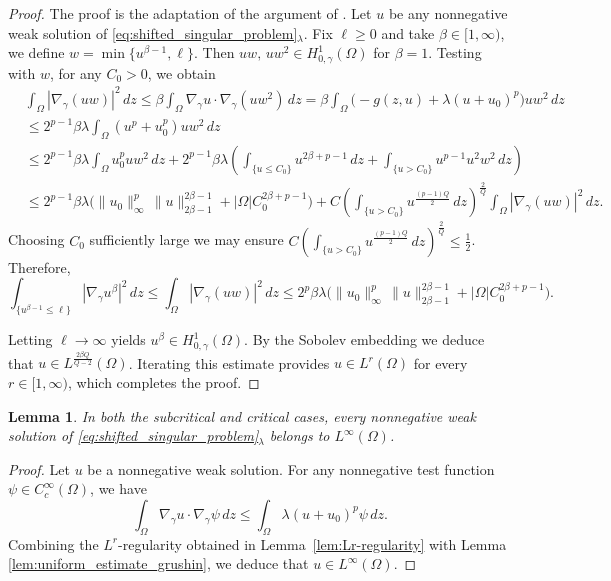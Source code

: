 \documentclass[11pt]{article}
\newtheorem{lemma}{Lemma}[section] %
\newcommand{\gradgr}{\nabla_{\gamma}}
\newcommand{\spacegr}{H^{1}_{0,\gamma}(\Omega)}
\begin{document}
\begin{proof}
The proof is the adaptation of the argument of \cite[Lemma B.3]{struwe_variational_methods}. Let $u$ be any nonnegative weak solution of \eqref{eq:shifted_singular_problem}$_\lambda$. 
Fix $\ell\ge0$ and take $\beta\in[1,\infty)$, we define $w = \min\{u^{\beta-1}, \ell\}$.
Then $uw,\,uw^2\in \spacegr$ for $\beta = 1$. Testing with $w$, for any $C_{0}>0$, we obtain
\begin{equation*}
\begin{aligned}
&\int_\Omega |\gradgr(uw)|^2\,dz
\le \beta \int_\Omega \gradgr u\cdot\gradgr(uw^2)\,dz  = \beta\int_\Omega\big(-g(z,u)+\lambda(u+u_{0})^p\big)uw^2\,dz \\
& \leq 2^{p-1}\beta\lambda\int_\Omega (u^p+u_{0}^p)uw^2\,dz \\
&\le 2^{p-1}\beta\lambda\int_\Omega u_{0}^p uw^2\,dz
+2^{p-1}\beta\lambda\left(
\int_{\{u\le C_{0}\}} u^{2\beta+p-1}\,dz
+\int_{\{ u>C_{0} \}} u^{p-1}u^2w^2\,dz
\right)\\
&\le 2^{p-1}\beta\lambda\Big(
\|u_{0}\|_\infty^p\,\|u\|_{2\beta-1}^{2\beta -1}
+|\Omega|C_{0}^{2\beta+p-1}
\Big)  +C\left(
\int_{\{u>C_{0}\}} u^{\frac{(p-1)Q}{2}}\,dz
\right)^{\!\frac{2}{Q}}
\int_\Omega |\gradgr(uw)|^2\,dz .
\end{aligned}
\end{equation*}
Choosing $C_{0}$ sufficiently large we may ensure $C\left(
\int_{\{ u>C_{0} \}} u^{\frac{(p-1)Q}{2}}\,dz
\right)^{\!\frac{2}{Q}}
\le \frac12$. Therefore,
\begin{equation*}
\int_{\{u^{\beta-1}\le \ell\}} |\gradgr u^\beta|^2\,dz
\le
\int_\Omega |\gradgr(uw)|^2\,dz
\le
2^p\beta\lambda
\Big(
\|u_{0}\|_\infty^p\,\|u\|_{2\beta-1}^{2\beta - 1}
+|\Omega|C_{0}^{2\beta+p-1}
\Big).
\end{equation*}

Letting $\ell\to\infty$ yields $u^\beta\in \spacegr$. By the Sobolev embedding we deduce that $u\in L^{\frac{2\beta Q}{Q-2}}(\Omega)$.
Iterating this estimate provides $u\in L^r(\Omega)$ for every $r\in[1,\infty)$, which completes the proof.
\end{proof}

\begin{lemma}\label{lem:L-infty-regularity}
In both the subcritical and critical cases, every nonnegative weak solution of \eqref{eq:shifted_singular_problem}$_\lambda$ belongs to $L^\infty(\Omega)$.
\end{lemma}

\begin{proof}
Let $u$ be a nonnegative weak solution. For any nonnegative test function $\psi\in C_c^\infty(\Omega)$, we have
\begin{equation*}
\int_{\Omega} \gradgr u \cdot \gradgr \psi \, dz
\le
\int_{\Omega} \lambda (u+u_{0})^{p}\psi \, dz .
\end{equation*}
Combining the $L^r$-regularity obtained in Lemma~\ref{lem:Lr-regularity} with Lemma \ref{lem:uniform_estimate_grushin}, we deduce that $u\in L^\infty(\Omega)$.
\end{proof}
\end{document}
